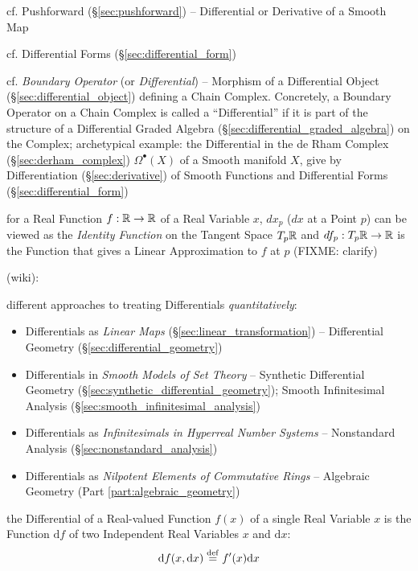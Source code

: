 \fist cf. Pushforward (\S\ref{sec:pushforward}) -- Differential or Derivative of
a Smooth Map

\fist cf. Differential Forms (\S\ref{sec:differential_form})

\fist cf. \emph{Boundary Operator} (or \emph{Differential}) -- Morphism of a
Differential Object (\S\ref{sec:differential_object}) defining a Chain Complex.
Concretely, a Boundary Operator on a Chain Complex is called a ``Differential''
if it is part of the structure of a Differential Graded Algebra
(\S\ref{sec:differential_graded_algebra}) on the Complex; archetypical example:
the Differential in the de Rham Complex (\S\ref{sec:derham_complex})
$\Omega^\bullet(X)$ of a Smooth manifold $X$, give by Differentiation
(\S\ref{sec:derivative}) of Smooth Functions and Differential Forms
(\S\ref{sec:differential_form})

for a Real Function $f : \mathbb{R} \rightarrow \mathbb{R}$ of a Real Variable $x$,
$dx_p$ ($dx$ at a Point $p$) can be viewed as the \emph{Identity Function} on
the Tangent Space $T_p\mathbb{R}$ and $df_p : T_p\mathbb{R} \rightarrow \mathbb{R}$ is the
Function that gives a Linear Approximation to $f$ at $p$ (FIXME: clarify)

(wiki):

different approaches to treating Differentials \emph{quantitatively}:
\begin{itemize}
  \item Differentials as \emph{Linear Maps} (\S\ref{sec:linear_transformation})
    -- Differential Geometry (\S\ref{sec:differential_geometry})
  \item Differentials in \emph{Smooth Models of Set Theory} -- Synthetic
    Differential Geometry (\S\ref{sec:synthetic_differential_geometry}); Smooth
    Infinitesimal Analysis (\S\ref{sec:smooth_infinitesimal_analysis})
  \item Differentials as \emph{Infinitesimals in Hyperreal Number Systems} --
    Nonstandard Analysis (\S\ref{sec:nonstandard_analysis})
  \item Differentials as \emph{Nilpotent Elements of Commutative Rings} --
    Algebraic Geometry (Part \ref{part:algebraic_geometry})
\end{itemize}

the Differential of a Real-valued Function $f(x)$ of a single Real Variable $x$
is the Function $\mathrm{d}f$ of two Independent Real Variables $x$ and
$\mathrm{d}x$:
\[
  \mathrm{d}f(x, \mathrm{d}x) \stackrel{\mathrm{def}}= f'(x)\mathrm{d}x
\]

\asterism

